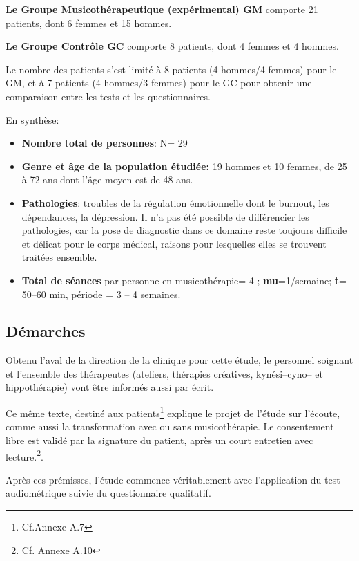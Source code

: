 \textbf{Le Groupe Musicothérapeutique (expérimental) GM} comporte 21
patients, dont 6
femmes et 15 hommes.

\textbf{Le  Groupe Contrôle GC} comporte 8 patients, dont 4 femmes et 4 hommes.

Le nombre
des patients s'est limité  à 8
patients (4 hommes/4 femmes) pour le GM, et à 7 patients (4 hommes/3
femmes) pour le GC pour obtenir une comparaison entre les tests et les questionnaires.




En synthèse:
 \begin{itemize}

 \item \textbf{Nombre total de personnes}: N= 29
\item\textbf{Genre et âge de la population étudiée:}  19 hommes et 10 femmes, de 25 à 72
  ans dont l'âge moyen est de 48 ans.
 \item\textbf{Pathologies}: troubles de la régulation émotionnelle
   dont le burnout, les dépendances, la dépression.
   Il n'a pas été
   possible de différencier les pathologies, car la pose de
   diagnostic dans ce domaine reste toujours difficile et délicat pour le corps médical, raisons pour lesquelles elles
   se trouvent traitées ensemble.
 \item \textbf{Total de séances} par personne en
   musicothérapie= 4 ;   \textbf{mu}=1/semaine;
 \textbf{t}= 50--60 min, période = 3 -- 4 semaines.
\end{itemize}




\subsection{Démarches}
Obtenu l'aval de la direction de la
clinique pour cette étude,  le personnel soignant et l'ensemble des
thérapeutes (ateliers, thérapies créatives, kynési--cyno--
et hippothérapie) vont être informés aussi par écrit.

Ce même texte, destiné aux
patients\footnote{Cf.Annexe A.7} explique le projet de l'étude sur l'écoute, comme aussi la transformation
avec ou sans musicothérapie.
Le consentement libre est validé par la signature du patient, après
un court entretien avec lecture.\footnote{Cf. Annexe A.10}.


Après ces prémisses, l'étude commence véritablement avec l'application du test
audiométrique suivie du questionnaire qualitatif.

